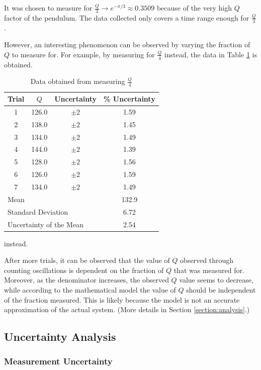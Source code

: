 \documentclass[aps,twocolumn,secnumarabic,nobalancelastpage,amsmath,amssymb,nofootinbib]{revtex4}
\begin{document}
It was chosen to measure for \(\frac{Q}{3} \rightarrow e^{-\pi/3} \approx 0.3509\) because of the very high \(Q\)
factor of the pendulum. The data collected only covers a time range enough for \(\frac{Q}{3}\).

However, an interesting phenomenon can be observed by varying the fraction of \(Q\) to measure for.
For example, by measuring for \(\frac{Q}{4}\) instead, the data in Table \ref{table:oscillation4} is obtained.
\begin{table}[h]
    \begin{tabular}{c|c|c|c}
        Trial & \(Q\) & Uncertainty & \% Uncertainty \\
        \hline
        1   & 126.0 & \(\pm 2\) & 1.59 \\
        2   & 138.0 & \(\pm 2\) & 1.45 \\
        3	& 134.0 & \(\pm 2\) & 1.49 \\
        4	& 144.0 & \(\pm 2\) & 1.39 \\
        5	& 128.0 & \(\pm 2\) & 1.56 \\
        6	& 126.0 & \(\pm 2\) & 1.59 \\
        7	& 134.0 & \(\pm 2\) & 1.49 \\
        \hline
        \multicolumn{3}{l}{Mean} & 132.9 \\
        \multicolumn{3}{l}{Standard Deviation} & 6.72 \\
        \multicolumn{3}{l}{Uncertainty of the Mean} & 2.54
    \end{tabular}
    \caption{Data obtained from measuring \(\frac{Q}{4}\)} instead.
    \label{table:oscillation4}
\end{table}

After more trials, it can be observed that the value of \(Q\) observed through counting oscillations is dependent on the
fraction of \(Q\) that was measured for. Moreover, as the denominator increases, the observed \(Q\) value seems to
decrease, while according to the mathematical model the value of \(Q\) should be independent of the fraction measured.
This is likely because the model is not an accurate approximation of the actual system. (More details in Section
\ref{section:analysis}.)

\subsection{Uncertainty Analysis}
\label{section:uncertainty}

\subsubsection{Measurement Uncertainty}
\end{document}
